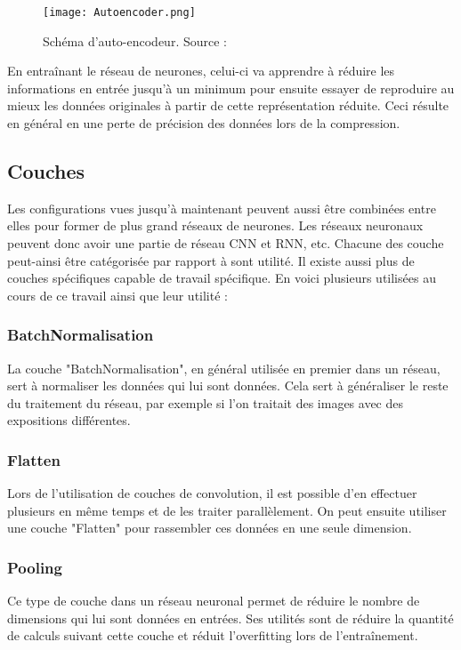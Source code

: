 \begin{figure}[tbph!]
	\centering
	\texttt{[image: Autoencoder.png]}
	\caption[Schéma d'auto-encodeur]{Schéma d'auto-encodeur. Source : \cite{Autoencoder}}
\end{figure}

En entraînant le réseau de neurones, celui-ci va apprendre à réduire les informations en entrée jusqu'à un minimum pour 
ensuite essayer de reproduire au mieux les données originales à partir de cette représentation réduite.
Ceci résulte en général en une perte de précision des données lors de la compression.

\subsection{Couches}
Les configurations vues jusqu'à maintenant peuvent aussi être combinées entre elles pour former de plus grand réseaux de neurones.
Les réseaux neuronaux peuvent donc avoir une partie de réseau CNN et RNN, etc. Chacune des couche peut-ainsi être catégorisée par
rapport à sont utilité.
Il existe aussi plus de couches spécifiques capable de travail spécifique. En voici plusieurs utilisées au cours de ce travail ainsi que leur utilité :

\subsubsection{BatchNormalisation}
La couche "BatchNormalisation", en général utilisée en premier dans un réseau, sert à normaliser les données qui lui sont données.
Cela sert à généraliser le reste du traitement du réseau, par exemple si l'on traitait des images avec des expositions différentes.

\subsubsection{Flatten}
Lors de l'utilisation de couches de convolution, il est possible d'en effectuer plusieurs en même temps et de les traiter parallèlement.
On peut ensuite utiliser une couche "Flatten" pour rassembler ces données en une seule dimension.

\subsubsection{Pooling}
Ce type de couche dans un réseau neuronal permet de réduire le nombre de dimensions qui lui sont données en entrées.
Ses utilités sont de réduire la quantité de calculs suivant cette couche et réduit l'overfitting lors de l'entraînement.

